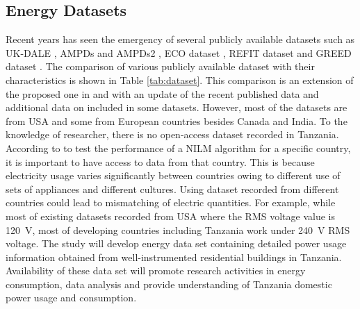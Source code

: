 \subsection{Energy Datasets}
\lipsum[1] 

Recent years has seen the emergency of several publicly available datasets such as UK-DALE \citep{Kelly2015}, AMPDs and AMPDs2 \citep{Makonin2013,Makonin2016}, ECO dataset \citep{Beckel2014}, REFIT dataset \citep{Murray2015b} and GREED dataset \citep{Monacchi2015a}. The comparison of various publicly available dataset with their characteristics is shown in Table \ref{tab:dataset}. This comparison is an extension of the proposed one in \citep{Bonfigli2015} and \citep{Murray2015b} with an update of the recent published data and additional data on included in some datasets. However, most of the datasets are from USA and some from European countries besides Canada and India. To the knowledge of researcher, there is no open-access dataset recorded in Tanzania. According to \cite{Kelly2015} to test the performance of a NILM algorithm for a specific country, it is important to have access to data from that country. This is because electricity usage varies significantly between countries owing to different use of sets of appliances and different cultures. Using dataset recorded from different countries could lead to mismatching of electric quantities. For example, while most of existing datasets recorded from USA where the RMS voltage value is \SI{120}{\volt}, most of developing countries including Tanzania work under \SI{240}{\volt} RMS voltage. The study will develop energy data set containing detailed power usage information obtained from well-instrumented residential buildings in Tanzania. Availability of these data set will promote research activities in energy consumption, data analysis and provide understanding of Tanzania domestic power usage and consumption.

